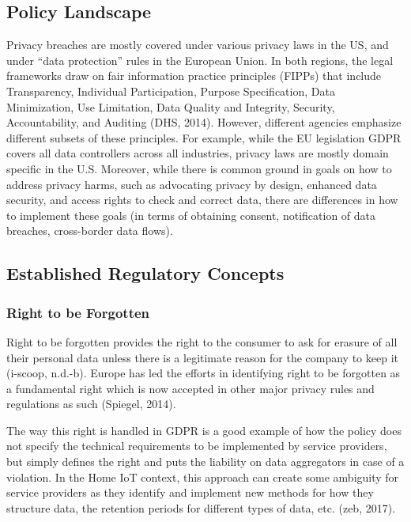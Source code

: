 \subsection{Policy Landscape}
Privacy breaches are mostly covered under various privacy laws in the US, and under “data protection” rules in the European Union. In both regions, the legal frameworks draw on fair information practice principles (FIPPs) that include Transparency, Individual Participation, Purpose Specification, Data Minimization, Use Limitation, Data Quality and Integrity, Security, Accountability, and Auditing (DHS, 2014). However, different agencies emphasize different subsets of these principles. For example, while the EU legislation GDPR covers all data controllers across all industries, privacy laws are mostly domain specific in the U.S. Moreover, while there is common ground in goals on how to address privacy harms, such as advocating privacy by design, enhanced data security, and access rights to check and correct data, there are differences in how to implement these goals (in terms of obtaining consent, notification of data breaches, cross-border data flows).

\subsection{Established Regulatory Concepts}
\subsubsection{Right to be Forgotten}
Right to be forgotten provides the right to the consumer to ask for erasure of all their personal data unless there is a legitimate reason for the company to keep it (i-scoop, n.d.-b). Europe has led the efforts in identifying right to be forgotten as a fundamental right which is now accepted in other major privacy rules and regulations as such (Spiegel, 2014). 

The way this right is handled in GDPR is a good example of how the policy does not specify the technical requirements to be implemented by service providers, but simply defines the right and puts the liability on data aggregators in case of a violation. In the Home IoT context, this approach can create some ambiguity for service providers as they identify and implement new methods for how they structure data, the retention periods for different types of data, etc. (zeb, 2017).

